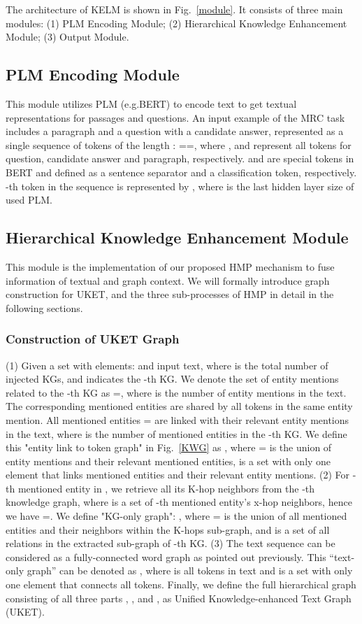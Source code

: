 \documentclass{article} \usepackage{iclr2022_conference,times}
\begin{document}
The architecture of KELM is shown in Fig.~\ref{module}. It consists of three main modules: (1) PLM Encoding Module; (2) Hierarchical Knowledge Enhancement Module; (3) Output Module. 

\subsection{PLM Encoding Module}

This module utilizes PLM (e.g.BERT) to encode text to get textual representations for passages and questions. An input example of the MRC task includes a paragraph and a question with a candidate answer, represented as a single sequence of tokens of the length : ==, where ,  and  represent all tokens for question, candidate answer and paragraph, respectively.  and  are special tokens in BERT and defined as a sentence separator and a classification token, respectively. -th token in the sequence is represented by , where  is the last hidden layer size of used PLM.

\subsection{Hierarchical Knowledge Enhancement Module}
This module is the implementation of our proposed HMP mechanism to fuse information of textual and graph context. We will formally introduce graph construction for UKET, and the three sub-processes of HMP in detail in the following sections. 

\subsubsection{Construction of UKET Graph}
(1) Given a set with  elements:  and input text, where  is the total number of injected KGs, and  indicates the -th KG. We denote the set of entity mentions related to the -th KG as =, where  is the number of entity mentions in the text. 
The corresponding mentioned entities are shared by all tokens in the same entity mention. All mentioned entities = are linked with their relevant entity mentions in the text, where  is the number of mentioned entities in the -th KG. We define this "entity link to token graph" in Fig.~\ref{KWG} as , where = is the union of entity mentions and their relevant mentioned entities,  is a set with only one element that links mentioned entities and their relevant entity mentions. 
(2) For -th mentioned entity  in , we retrieve all its K-hop neighbors  from the -th knowledge graph, where  is a set of -th mentioned entity's x-hop neighbors, hence we have =. We define "KG-only graph": , where = is the union of all mentioned entities and their neighbors within the K-hops sub-graph, and  is a set of all relations in the extracted sub-graph of -th KG. 
(3) The text sequence can be considered as a fully-connected word graph as pointed out previously. This ``text-only graph'' can be denoted as , where  is all tokens in text and  is a set with only one element that connects all tokens. 
Finally, we define the full hierarchical graph consisting of all three parts , , and , as Unified Knowledge-enhanced Text Graph (UKET).
\end{document}
